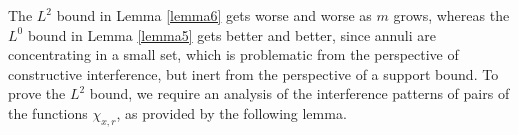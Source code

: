
\begin{comment}
\begin{proof}[Proof of Lemma \ref{lemma3} from Lemma \ref{lemma6}]
    Write $F = \sum\nolimits_{(x,r) \in \mathcal{E}_k} \chi_{x,r}$, and then perform a decomposition $\mathcal{E}_k = \bigcup_{m \geq 0} \mathcal{E}_k(2^m)$, and thus define $F = \sum\nolimits_{m \geq 0} F_m$, where
    \[ F_m = \sum\nolimits_{(x,r) \in \mathcal{E}(2^m)} \chi_{x,r}. \]
    We have
    \[ \| F_m \|_{L^2(\RR^d)} \lesssim 2^{\frac{m}{d-1} + \frac{k(d-1)}{2}} \log(2 + 2^m)^{1/2} \cdot \#(\mathcal{E}_k)^{1/2}. \]
    If we interpolate this bound with the support bound for $F_m$, a kind of $L^0$ norm estimate, we conclude that for $0 < p \leq 2$,
    \begin{align*}
        \| F_m \|_{L^p(\RR^d)} &\leq |\text{Supp}(F_m)|^{1/p - 1/2} \| F_m \|_{L^2(\RR^d)}\\
        &\lesssim ( 2^{k(d-1) - m})^{1/p - 1/2} 2^{\frac{m}{d-1} + \frac{k(d-1)}{2}} \log(2 + 2^m)^{1/2} \cdot \#(\mathcal{E}_k)^{1/p} \\
        &\lesssim 2^{m(1/p_d - 1/p)} \log(2 + 2^m)^{1/2} 2^{\frac{k(d-1)}{p}} \#(\mathcal{E}_k)^{1/p}.
    \end{align*}
    where $p_d = 2(d-1)/(d+1)$. This bound is summable in $m$ for $p < p_d$, which enables us to conclude that
    \[ \| F \|_{L^p(\RR^d)} \lesssim 2^{\frac{k(d-1)}{p}} \#(\mathcal{E}_k)^{1/p}. \]
    Thus for $1 \leq p < p_d$, we obtain the bound stated in Lemma \ref{lemma3}.
\end{proof}
\end{comment}

The $L^2$ bound in Lemma \ref{lemma6} gets worse and worse as $m$ grows, whereas the $L^0$ bound in Lemma \ref{lemma5} gets better and better, since annuli are concentrating in a small set, which is problematic from the perspective of constructive interference, but inert from the perspective of a support bound. To prove the $L^2$ bound, we require an analysis of the interference patterns of pairs of the functions $\chi_{x,r}$, as provided by the following lemma.

